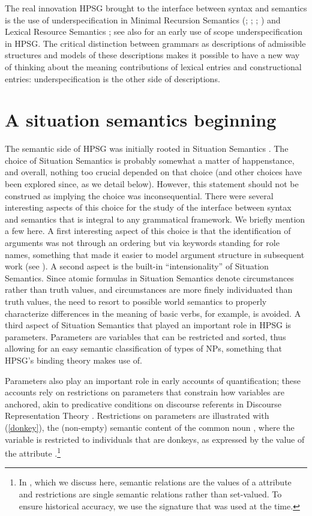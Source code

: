 \documentclass[output=paper]{langsci/langscibook}
\begin{document}
The real innovation HPSG brought to the interface between syntax and semantics is the use of underspecification in Minimal Recursion Semantics (\citealt*{Copestakeetal1995}; \citealt{Egg1998}; \citealt*{Copestakeetal2001}; \citealt*{Copestakeetal2005}) and Lexical Resource Semantics \citep{RichterandSailer2001}; see also \citet{Nerbonne1993a} for an early use of scope underspecification in HPSG. The critical distinction between grammars as descriptions of admissible structures and models of these descriptions makes it possible to have a new way of thinking about the meaning contributions of lexical entries and constructional entries: underspecification is the other side of descriptions. 

\section{A situation semantics beginning}

The semantic side of HPSG was initially rooted in Situation Semantics \citep[Chapter 4]{PollardandSag1987}. The choice of Situation Semantics is probably somewhat a matter of happenstance, and overall, nothing too crucial depended on that choice (and other choices have been explored since, as we detail below). However, this statement should not be construed as implying the choice was inconsequential. There were several interesting aspects of this choice for the study of the interface between syntax and semantics that is integral to any grammatical framework. We briefly mention a few here. A first interesting aspect of this choice is that the identification of arguments was not through an ordering but via keywords standing for role names, something that made it easier to model argument structure in subsequent work (see ). A second aspect is the built-in ``intensionality'' of Situation Semantics. Since atomic formulas in Situation Semantics denote circumstances rather than truth values, and circumstances are more finely individuated than truth values, the need to resort to possible world semantics to properly characterize differences in the meaning of basic verbs, for example, is avoided. A third aspect of Situation Semantics that played an important role in HPSG is parameters. Parameters are variables that can be restricted and sorted, thus allowing for an easy semantic classification of types of NPs, something that HPSG's binding theory makes use of.

Parameters also play an important role in early accounts of quantification; these accounts rely on restrictions on parameters that constrain how variables are anchored, akin to predicative conditions on discourse referents in Discourse Representation Theory \citep{KampandReyle1993}. Restrictions on parameters are illustrated with (\ref{donkey}), the (non-empty) semantic content of the common noun , where the variable  is restricted to individuals that are donkeys, as expressed by the value of the attribute .\footnote{In \citet{PollardandSag1987}, which we discuss here, semantic relations are the values of a  attribute and restrictions are single semantic relations rather than set-valued. To ensure historical accuracy, we use the signature that was used at the time.}
\end{document}
